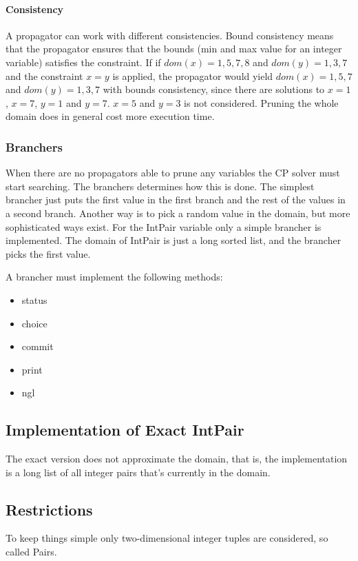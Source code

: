 \documentclass[a4paper,11pt]{article}
\begin{document}
\paragraph{Consistency}
A propagator can work with different consistencies. Bound consistency means that the propagator ensures that the bounds (min and max value for an integer variable) satisfies the constraint. If if $dom(x)={1,5,7,8}$ and $dom(y)={1,3,7}$ and the constraint $x=y$ is applied, the propagator would yield $dom(x)={1,5,7}$ and $dom(y)={1,3,7}$ with bounds consistency, since there are solutions to $x=1$, $x=7$, $y=1$ and $y=7$. $x=5$ and $y=3$ is not considered. Pruning the whole domain does in general cost more execution time.

\subsubsection{Branchers}
When there are no propagators able to prune any variables the CP solver must start searching. The branchers determines how this is done. The simplest brancher just puts the first value in the first branch and the rest of the values in a second branch. Another way is to pick a random value in the domain, but more sophisticated ways exist. For the IntPair variable only a simple brancher is implemented. The domain of IntPair is just a long sorted list, and the brancher picks the first value.

A brancher must implement the following methods:
\begin{itemize}
\item{status}
\item{choice}
\item{commit}
\item{print}
\item{ngl}
\end{itemize}

\subsection{Implementation of Exact IntPair}
The exact version does not approximate the domain, that is, the implementation is a long list of all integer pairs that's currently in the domain.

\subsection{Restrictions}
To keep things simple only two-dimensional integer tuples are considered, so called Pairs.
\end{document}
